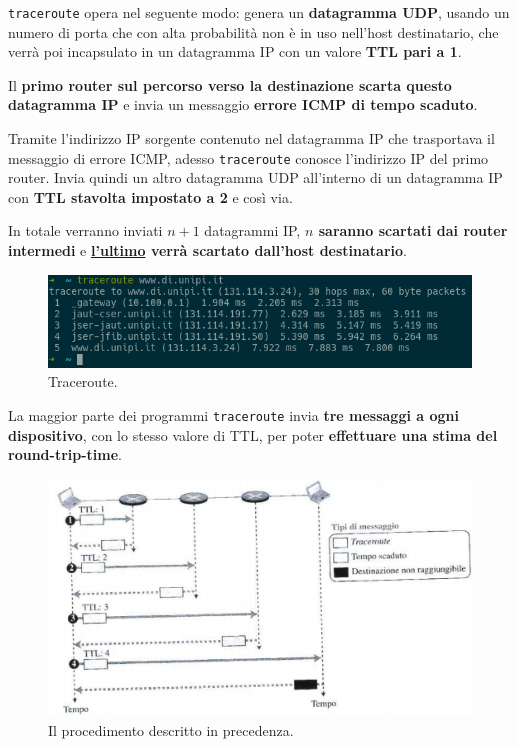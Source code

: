 \documentclass[11pt,a4paper,oneside]{book}
\theoremstyle{definition}
\begin{document}
\begin{itemize}
	      \texttt{traceroute} opera nel seguente modo: genera un \textbf{datagramma UDP}, usando un numero di porta che con alta probabilità non è in uso nell'host destinatario, che verrà poi incapsulato in un datagramma IP con un valore\textbf{ TTL pari a  1}.

	      Il \textbf{primo router sul percorso verso la destinazione scarta questo datagramma IP} e invia un messaggio \textbf{errore ICMP di tempo scaduto}.

	      Tramite l'indirizzo IP  sorgente contenuto nel datagramma IP che trasportava il messaggio di errore ICMP, adesso \texttt{traceroute} conosce l'indirizzo IP del primo router. Invia quindi un altro datagramma UDP all'interno di un datagramma IP con \textbf{TTL stavolta impostato a 2} e così via.

	      In totale verranno inviati \underline{$n + 1$} datagrammi IP,\textbf{ \underline{$n$} saranno scartati dai router intermedi} e \textbf{\underline{l'ultimo} verrà scartato dall'host destinatario}.

	      \begin{figure}[!h]
		      \includegraphics[scale=2.2]{Immagini/Traceroute.png}
		      \centering
		      \caption{Traceroute.}
	      \end{figure}

	      La maggior parte dei programmi \texttt{traceroute} invia \textbf{tre messaggi a ogni dispositivo}, con lo stesso valore di TTL, per poter \textbf{effettuare una stima del round-trip-time}.

	      \pagebreak

	      \begin{figure}[!h]
		      \includegraphics[scale=1.7]{Immagini/Traceroute1.png}
		      \centering
		      \caption{Il procedimento descritto in precedenza.}
	      \end{figure}


\end{itemize}
\end{document}
